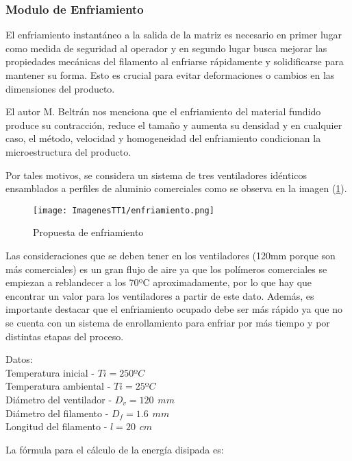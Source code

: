 \documentclass[14pt,oneside]{extarticle} %
\begin{document}
\subsubsection{Modulo de Enfriamiento}

El enfriamiento instantáneo a la salida de la matriz es necesario en primer lugar como medida de seguridad al operador y en segundo lugar busca mejorar las propiedades mecánicas del filamento al enfriarse rápidamente y solidificarse para mantener su forma. Esto es crucial para evitar deformaciones o cambios en las dimensiones del producto.

El autor M. Beltrán \cite{beltran} nos menciona que el enfriamiento del material fundido produce su contracción, reduce el tamaño y aumenta su densidad y en cualquier caso, el método, velocidad y homogeneidad del enfriamiento condicionan la microestructura del producto.

Por tales motivos, se considera un sistema de tres ventiladores idénticos ensamblados a perfiles de aluminio comerciales como se observa en la imagen (\ref{fig:ventilacion}).

\begin{figure}[h]
    \centering
    \texttt{[image: ImagenesTT1/enfriamiento.png]}
    \caption{Propuesta de enfriamiento}
    \label{fig:ventilacion}
\end{figure}

Las consideraciones que se deben tener en los ventiladores (120mm porque son más comerciales) es un gran flujo de aire ya que los polímeros comerciales se empiezan a reblandecer a los 70ºC aproximadamente, por lo que hay que encontrar un valor para los ventiladores a partir de este dato. Además, es importante destacar que el enfriamiento ocupado debe ser más rápido ya que no se cuenta con un sistema de enrollamiento para enfriar por más tiempo y por distintas etapas del proceso.

Datos:\\
Temperatura inicial - $Ti=250ºC$\\
Temperatura ambiental - $Ti=25ºC$\\
Diámetro del ventilador - $D_v=120\hspace{5pt}mm$\\
Diámetro del filamento - $D_f=1.6\hspace{5pt}mm$\\
Longitud del filamento - $l=20\hspace{5pt}cm$

La fórmula para el cálculo de la energía disipada es:
\end{document}
